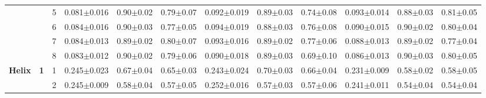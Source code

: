 \begin{table*}
{\begin{tabular}{|l|c|c||c|c|c||c|c|c||c|c|c|}
 & & 5 & \textcolor{gate_color}{0.081$\pm$0.016} & \textcolor{gate_color}{0.90$\pm$0.02} & \textcolor{gate_color}{0.79$\pm$0.07} & \textcolor{mixed_color}{0.092$\pm$0.019} & \textcolor{mixed_color}{0.89$\pm$0.03} & \textcolor{mixed_color}{0.74$\pm$0.08} & \textcolor{pulsed_color}{0.093$\pm$0.014} & \textcolor{pulsed_color}{0.88$\pm$0.03} & \textcolor{pulsed_color}{0.81$\pm$0.05} \\
 & & 6 & \textcolor{gate_color}{0.084$\pm$0.016} & \textcolor{gate_color}{0.90$\pm$0.03} & \textcolor{gate_color}{0.77$\pm$0.05} & \textcolor{mixed_color}{0.094$\pm$0.019} & \textcolor{mixed_color}{0.88$\pm$0.03} & \textcolor{mixed_color}{0.76$\pm$0.08} & \textcolor{pulsed_color}{0.090$\pm$0.015} & \textcolor{pulsed_color}{0.90$\pm$0.02} & \textcolor{pulsed_color}{0.80$\pm$0.04} \\
 & & 7 & \textcolor{gate_color}{0.084$\pm$0.013} & \textcolor{gate_color}{0.89$\pm$0.02} & \textcolor{gate_color}{0.80$\pm$0.07} & \textcolor{mixed_color}{0.093$\pm$0.016} & \textcolor{mixed_color}{0.89$\pm$0.02} & \textcolor{mixed_color}{0.77$\pm$0.06} & \textcolor{pulsed_color}{0.088$\pm$0.013} & \textcolor{pulsed_color}{0.89$\pm$0.02} & \textcolor{pulsed_color}{0.77$\pm$0.04} \\
 & & 8 & \textcolor{gate_color}{0.083$\pm$0.012} & \textcolor{gate_color}{0.90$\pm$0.02} & \textcolor{gate_color}{0.79$\pm$0.06} & \textcolor{mixed_color}{0.090$\pm$0.018} & \textcolor{mixed_color}{0.89$\pm$0.03} & \textcolor{mixed_color}{0.69$\pm$0.10} & \textcolor{pulsed_color}{0.086$\pm$0.013} & \textcolor{pulsed_color}{0.90$\pm$0.03} & \textcolor{pulsed_color}{0.80$\pm$0.05} \\
\hline\hline
\multirow{12}{*}{\textbf{Helix}} & \multirow{8}{*}{\textbf{1}} & 1 & \textcolor{gate_color}{0.245$\pm$0.023} & \textcolor{gate_color}{0.67$\pm$0.04} & \textcolor{gate_color}{0.65$\pm$0.03} & \textcolor{mixed_color}{0.243$\pm$0.024} & \textcolor{mixed_color}{0.70$\pm$0.03} & \textcolor{mixed_color}{0.66$\pm$0.04} & \textcolor{pulsed_color}{0.231$\pm$0.009} & \textcolor{pulsed_color}{0.58$\pm$0.02} & \textcolor{pulsed_color}{0.58$\pm$0.05} \\
 & & 2 & \textcolor{gate_color}{0.245$\pm$0.009} & \textcolor{gate_color}{0.58$\pm$0.04} & \textcolor{gate_color}{0.57$\pm$0.05} & \textcolor{mixed_color}{0.252$\pm$0.016} & \textcolor{mixed_color}{0.57$\pm$0.03} & \textcolor{mixed_color}{0.57$\pm$0.06} & \textcolor{pulsed_color}{0.241$\pm$0.011} & \textcolor{pulsed_color}{0.54$\pm$0.04} & \textcolor{pulsed_color}{0.54$\pm$0.04} \\

\end{tabular}}
\end{table*}

